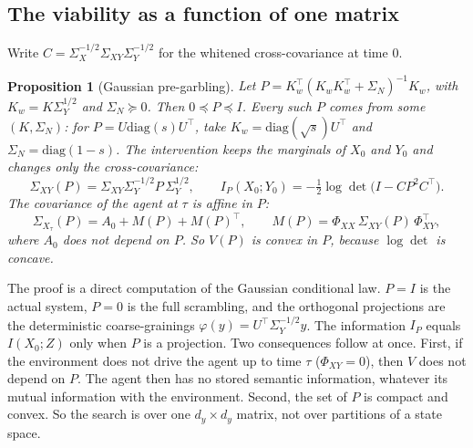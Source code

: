\documentclass[11pt]{article}
\newtheorem{proposition}{Proposition}
\begin{document}
\subsection{The viability as a function of one matrix}
\label{sec:b1}
Write $C=\Sigma_X^{-1/2}\Sigma_{XY}\Sigma_Y^{-1/2}$ for the whitened cross-covariance at time 0.

\begin{proposition}[Gaussian pre-garbling]\label{prop:P}
Let $P=K_w^\top(K_wK_w^\top+\Sigma_N)^{-1}K_w$, with $K_w=K\Sigma_Y^{1/2}$ and $\Sigma_N\succeq0$. Then
$0\preceq P\preceq I$. Every such $P$ comes from some $(K,\Sigma_N)$: for $P=U\mathrm{diag}(s)U^\top$, take
$K_w=\mathrm{diag}(\sqrt s)U^\top$ and $\Sigma_N=\mathrm{diag}(1-s)$. The intervention keeps the marginals of $X_0$ and $Y_0$ and changes only the
cross-covariance:
\begin{equation}
  \Sigma_{XY}(P)=\Sigma_{XY}\Sigma_Y^{-1/2}P\,\Sigma_Y^{1/2}, \qquad
  I_P(X_0;Y_0) = -\tfrac12\log\det\bigl(I-CP^2C^\top\bigr).
\end{equation}
The covariance of the agent at $\tau$ is affine in $P$:
\begin{equation}
  \Sigma_{X_\tau}(P) = A_0 + M(P) + M(P)^\top, \qquad M(P)=\Phi_{XX}\,\Sigma_{XY}(P)\,\Phi_{XY}^\top ,
  \label{eq:affine}
\end{equation}
where $A_0$ does not depend on $P$. So $V(P)$ is convex in $P$, because $\log\det$ is concave.
\end{proposition}

The proof is a direct computation of the Gaussian conditional law. $P=I$ is the actual system, $P=0$ is the full
scrambling, and the orthogonal projections are the deterministic coarse-grainings $\varphi(y)=U^\top\Sigma_Y^{-1/2}y$.
The information $I_P$ equals $I(X_0;Z)$ only when $P$ is a projection. Two consequences follow at once. First, if
the environment does not drive the agent up to time $\tau$ ($\Phi_{XY}=0$), then $V$ does not depend on $P$. The agent
then has no stored semantic information, whatever its mutual information with the environment. Second, the set of $P$
is compact and convex. So the search is over one $d_y\times d_y$ matrix, not over partitions of a state space.
\end{document}
